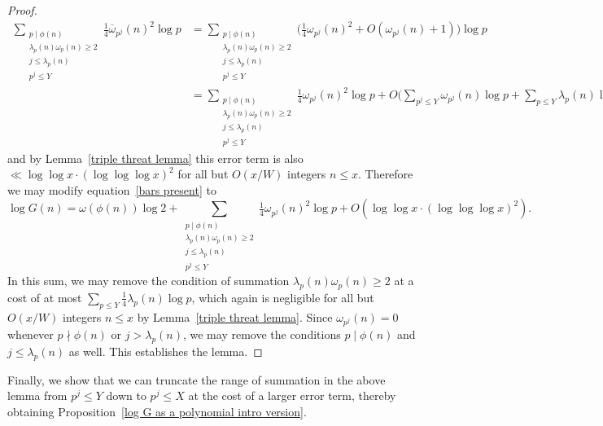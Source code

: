 \documentclass[12pt,reqno]{amsart}
\theoremstyle{definition}
\newcommand{\ovomega}{{\overline\omega}}
\begin{document}
\begin{proof}
\begin{align*}
\sum_{\substack{p\mid\phi(n) \\ \lambda_p(n)\omega_p(n)\ge2 \\ j\le \lambda_p(n) \\ p^j\le Y}} \tfrac14 \ovomega_{p^j}(n)^2 \log p &= \sum_{\substack{p\mid\phi(n) \\ \lambda_p(n)\omega_p(n)\ge2 \\ j\le \lambda_p(n) \\ p^j\le Y}} \big( \tfrac14 \omega_{p^j}(n)^2 + O( \omega_{p^j}(n)+1 ) \big) \log p \\
&= \sum_{\substack{p\mid\phi(n) \\ \lambda_p(n)\omega_p(n)\ge2 \\ j\le \lambda_p(n) \\ p^j \le Y}} \tfrac14 \omega_{p^j}(n)^2 \log p + O\bigg( \sum_{p^j\le Y} \omega_{p^j}(n) \log p + \sum_{p\le Y} \lambda_p(n) \log p \bigg),
\end{align*}
and by Lemma~\ref{triple threat lemma} this error term is also $\ll \log\log x \cdot (\log\log\log x)^2$ for all but $O(x/W)$ integers $n\le x$. Therefore we may modify equation~\eqref{bars present} to
\begin{equation*}
\log G(n) = \omega(\phi(n)) \log 2 + \sum_{\substack{p\mid\phi(n) \\ \lambda_p(n)\omega_p(n)\ge2 \\ j\le \lambda_p(n) \\ p^j\le Y}} \tfrac14 \omega_{p^j}(n)^2 \log p + O(\log\log x \cdot (\log\log\log x)^2).
\end{equation*}
In this sum, we may remove the condition of summation $\lambda_p(n)\omega_p(n)\ge2$ at a cost of at most $\sum_{p\le Y} \frac14\lambda_p(n)\log p$, which again is negligible for all but $O(x/W)$ integers $n\le x$ by Lemma~\ref{triple threat lemma}. Since $\omega_{p^j}(n)=0$ whenever $p\nmid\phi(n)$ or $j>\lambda_p(n)$, we may remove the conditions $p\mid\phi(n)$ and $j\le\lambda_p(n)$ as well. This establishes the lemma.
\end{proof}

Finally, we show that we can truncate the range of summation in the above lemma from $p^j \le Y$ down to $p^j \leq X$ at the cost of a larger error term, thereby obtaining Proposition~\ref{log G as a polynomial intro version}.
\end{document}
